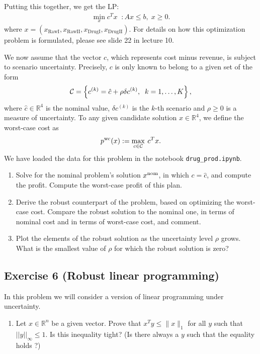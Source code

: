 \documentclass[11pt]{article}
\begin{document}
Putting this together, we get the LP:
\begin{align*}
    \min_{x} c^T x \; \; : Ax \leq b, \; x \geq 0.
\end{align*}
where $x= (x_{\text{RawI}},x_{\text{RawII}},x_{\text{DrugI}},x_{\text{DrugII}})$. For details on how this optimization problem is formulated, please see slide 22 in lecture 10.

We now assume that the vector $c$, which represents cost minus revenue, is subject to scenario uncertainty. Precisely, $c$ is only known to belong to a given set of the form
\[
{\cal C} = \left\{ c^{(k)} = \hat{c} + \rho \delta c^{(k)}, \;\; k=1,\ldots,K \right\},
\]
where $\hat{c} \in \mathbb{R}^{4}$ is the nominal value, $\delta c^{(k)}$ is the $k$-th scenario and $\rho \geq 0$ is a measure of uncertainty. To any given candidate solution $x \in \mathbb{R}^{4}$, we define the worst-case cost as
\[
p^{\rm wc}(x) := \max_{c \in {\cal C}} \: c^Tx.
\]
We have loaded the data for this problem in the notebook {\tt drug\_prod.ipynb}.
\begin{enumerate}
\item Solve for the nominal problem's solution $x^{\rm nom}$, in which $c = \hat{c}$, and compute the profit. Compute the worst-case profit of this plan.

\item Derive the robust counterpart of the problem, based on optimizing the worst-case cost. Compare the robust solution to the nominal one, in terms of nominal cost and in terms of worst-case cost, and comment.

\item Plot the elements of the robust solution as the uncertainty level $\rho$ grows. What is the smallest value of $\rho$ for which the robust solution is zero?

\end{enumerate}

\begin{solution}
\end{solution}

\newpage
\subsection*{Exercise 6 (Robust linear programming)}

In this problem we will consider a version of linear programming under uncertainty.
\begin{enumerate}
    \item Let $x \in \mathbb{R}^n$ be a given vector. Prove that $x^Ty \leq \|x\|_1$ for all $y$ such that $||y||_{\infty} \leq 1$. Is this inequality tight? (Is there always a $y$ such that the equality holds ?)
\end{enumerate}
\end{document}
